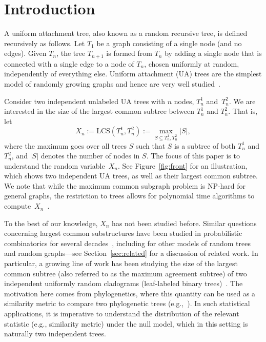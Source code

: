 \documentclass[11pt]{article}
\numberwithin{equation}{section}
\newcommand{\LCS}{\mathrm{LCS}} %
\theoremstyle{definition}
\begin{document}
\section{Introduction} \label{sec:intro} %

A uniform attachment tree, also known as a random recursive tree, is defined recursively as follows. 
Let $T_1$ be a graph consisting of a single node (and no edges). 
Given $T_n$, the tree $T_{n+1}$ is formed from $T_n$ by adding a single node that is connected with a single edge to a node of $T_n$, chosen uniformly at random, independently of everything else.  
Uniform attachment (UA) trees are the simplest model of randomly growing graphs and hence are very well studied~\cite{drmota2009random}. 


Consider two independent unlabeled 
UA 
trees with $n$ nodes, $T_{n}^{1}$ and~$T_{n}^{2}$. We are interested in the size of the largest common subtree between $T_{n}^{1}$ and $T_{n}^{2}$. That is, let 
\[
X_{n} 
:= \LCS \left( T_{n}^{1}, T_{n}^{2} \right) 
:= \max_{S \subseteq T_{n}^{1}, T_{n}^{2}} |S|, 
\]
where the maximum goes over all trees $S$ such that $S$ is a subtree of both $T_{n}^{1}$ and $T_{n}^{2}$, and $|S|$ denotes the number of nodes in $S$. 
The focus of this paper is to understand the random variable~$X_{n}$. 
See Figure~\ref{fig:front} for an illustration, which shows two independent UA trees, as well as their largest common subtree. %
We note that while the maximum common subgraph problem is NP-hard for general graphs, the restriction to trees allows for polynomial time algorithms to compute~$X_n$~\cite{droschinsky2016faster}.


To the best of our knowledge, $X_{n}$ has not been studied before. 
Similar questions concerning largest common substructures have been studied in probabilistic combinatorics for several decades~\cite{AldousOpenProblem_substructures}, 
including for other models of random trees and random graphs---see Section~\ref{sec:related} for a discussion of related work. 
In particular, a growing line of work 
has been studying the size of the largest common subtree (also referred to as the maximum agreement subtree) 
of two independent uniformly random cladograms (leaf-labeled binary trees)~\cite{AldousOpenProblem_substructures,bryant2003size,bernstein2015bounds,misra2019bounds,bordewich2022maximum,aldous2022largest,pittel2023expected,khezeli2024improved,budzinski2024maximum}. 
The motivation here comes from phylogenetics, where this quantity can be used as a similarity metric to compare two phylogenetic trees (e.g.,~\cite{de2007congruence}). 
In such statistical applications, it is imperative to understand the distribution of the relevant statistic (e.g., similarity metric) under the null model, which in this setting is naturally two independent trees. 
\end{document}

